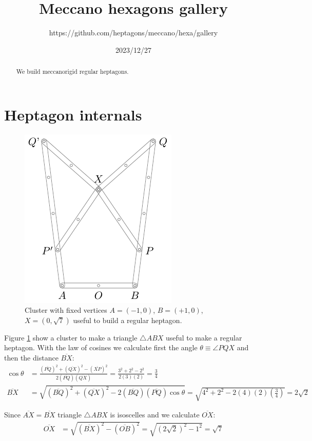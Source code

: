 \documentclass[11pt]{article}
\title{Meccano hexagons gallery}
\author{https://github.com/heptagons/meccano/hexa/gallery}
\date{2023/12/27}
\begin{document}
\maketitle
\begin{abstract}
We build meccano\meccanoref rigid regular heptagons.
\end{abstract}

\section{Heptagon internals}

\begin{figure}[h]
\centering
\includegraphics[scale=0.9]{builder/hepta-base}
\caption{Cluster with fixed vertices $A=(-1,0)$, $B=(+1,0)$, $X=(0,\sqrt7)$ useful to build a regular heptagon.}
\label{fig:build-base}
\end{figure}

Figure \ref{fig:build-base} show a cluster to make a triangle $\triangle{ABX}$ useful to make a regular heptagon. With the law of cosines we calculate first the angle $\theta \equiv \angle{PQX}$ and then the distance $\overline{BX}$:
\begin{align}
\cos\theta &= \frac{(\overline{PQ})^2 + (\overline{QX})^2 - (\overline{XP})^2}
 {2(\overline{PQ})(\overline{QX})} 
 = \frac{3^2 + 2^2 - 2^2}{2(3)(2)} = \frac{3}4 \\
\overline{BX} &= \sqrt{(\overline{BQ})^2 + (\overline{QX})^2 
 - 2(\overline{BQ})(\overline{PQ})\cos\theta}
 = \sqrt{4^2 + 2^2 - 2(4)(2)\left(\frac{3}4\right)} = 2\sqrt2
\end{align}

Since $\overline{AX} = \overline{BX}$ triangle $\triangle{ABX}$ is isoscelles and we calculate $\overline{OX}$:
\begin{align}
\overline{OX} &= \sqrt{(\overline{BX})^2 - (\overline{OB})^2}
 = \sqrt{(2\sqrt2)^2 - 1^2} = \sqrt7
\end{align}
\end{document}
